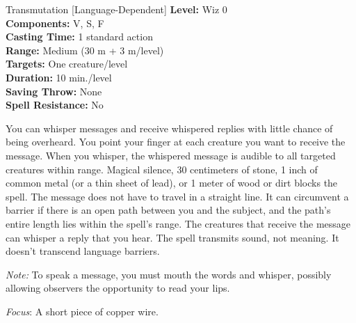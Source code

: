{Transmutation [Language-Dependent]}
{
	\textbf{Level:}
	Wiz 0\\
	\textbf{Components:}
	V, S, F\\
	\textbf{Casting Time:}
	1 standard action\\
	\textbf{Range:}
	Medium (30 m + 3 m/level)\\
	\textbf{Targets:}
	One creature/level\\
	\textbf{Duration:}
	10 min./level\\
	\textbf{Saving Throw:}
	None\\
	\textbf{Spell Resistance:}
	No\\
}
{
	You can whisper messages and receive whispered replies with little chance of being overheard. You point your finger at each creature you want to receive the message. When you whisper, the whispered message is audible to all targeted creatures within range. Magical silence, 30 centimeters of stone, 1 inch of common metal (or a thin sheet of lead), or 1 meter of wood or dirt blocks the spell. The message does not have to travel in a straight line. It can circumvent a barrier if there is an open path between you and the subject, and the path's entire length lies within the spell's range. The creatures that receive the message can whisper a reply that you hear. The spell transmits sound, not meaning. It doesn't transcend language barriers.

	\textit{Note:} To speak a message, you must mouth the words and whisper, possibly allowing observers the opportunity to read your lips.

	\textit{Focus}:
	A short piece of copper wire.

}
